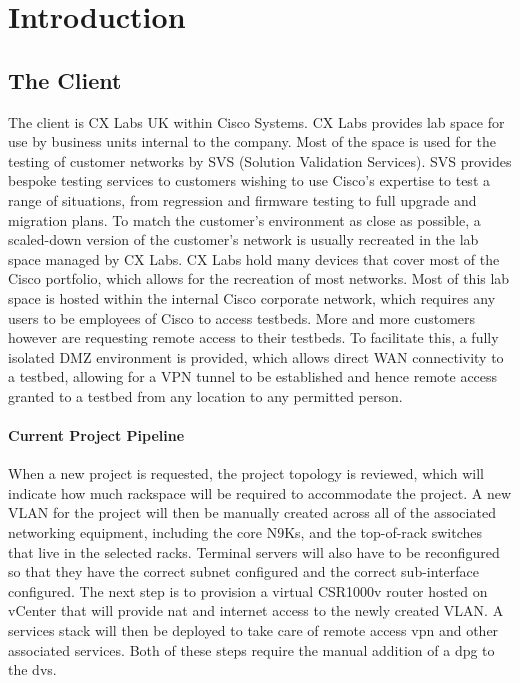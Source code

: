 \chapter{Introduction}
\label{chap:intro}

\section{The Client}
\label{intro:client}

The client is CX Labs UK within Cisco Systems. CX Labs provides lab space for
use by business units internal to the company. Most of the space is used for
the testing of customer networks by SVS (Solution Validation Services). SVS
provides bespoke testing services to customers wishing to use Cisco’s expertise
to test a range of situations, from regression and firmware testing to full
upgrade and migration plans.\newline
To match the customer's environment as close as possible, a scaled-down
version of the customer's network is usually recreated in the lab space managed
by CX Labs. CX Labs hold many devices that cover most of the Cisco portfolio,
which allows for the recreation of most networks. Most of this lab space is
hosted within the internal Cisco corporate network, which requires any users to
be employees of Cisco to access testbeds. More and more customers
however are requesting remote access to their testbeds. To facilitate this, a
fully isolated DMZ environment is provided, which allows direct WAN
connectivity to a testbed, allowing for a VPN tunnel to be established and
hence remote access granted to a testbed from any location to any permitted
person.

\subsubsection{Current Project Pipeline}
When a new project is requested, the project topology is reviewed, which will indicate how much rackspace will be required to accommodate the project. A new VLAN for the project will then be manually created across all of the associated networking equipment, including the core N9Ks, and the top-of-rack switches that live in the selected racks. Terminal servers will also have to be reconfigured so that they have the correct subnet configured and the correct sub-interface configured. The next step is to provision a virtual CSR1000v router hosted on vCenter that will provide \gls{nat} and internet access to the newly created VLAN. A services stack will then be deployed to take care of remote access \gls{vpn} and other associated services. Both of these steps require the manual addition of a \gls{dpg} to the \gls{dvs}.
